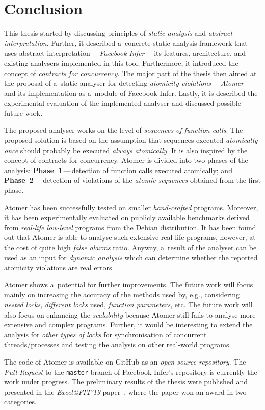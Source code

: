 \chapter{Conclusion}
\label{chap:conc}

This thesis started by discussing principles of \emph{static analysis} and
\emph{abstract interpretation}. Further, it described a~concrete static
analysis framework that uses abstract interpretation\,---\,\emph{Facebook
Infer}\,---\,its features, architecture, and existing analysers implemented
in this tool. Furthermore, it introduced the concept of
\emph{contracts for concurrency}. The major part of the thesis then aimed
at the proposal of a~static analyser for detecting \emph{atomicity
violations}\,---\,\emph{Atomer}\,---\,and its implementation as a~module
of Facebook Infer. Lastly, it is described the experimental evaluation of
the implemented analyser and discussed possible future work.

The proposed analyser works on the level of \emph{sequences of function
calls}. The proposed solution is based on the assumption that sequences
executed \emph{atomically once} should probably be executed \emph{always
atomically}. It is also inspired by the concept of contracts for concurrency.
Atomer is divided into two phases of the analysis:
\textbf{Phase~1}\,---\,detection of function calls executed atomically; and
\textbf{Phase~2}\,---\,detection of violations of the \emph{atomic sequences}
obtained from the first phase.

Atomer has been successfully tested on smaller \emph{hand-crafted}
programs. Moreover, it has been experimentally evaluated on publicly
available benchmarks derived from \emph{real-life low-level} programs
from the Debian distribution. It has been found out that Atomer is able
to analyse such extensive real-life programs, however, at the cost of quite
high \emph{false alarms} ratio. Anyway, a~result of the analyser can be
used as an input for \emph{dynamic analysis} which can determine whether
the reported atomicity violations are real errors.

Atomer shows a~potential for further improvements. The future work will
focus mainly on increasing the accuracy of the methods used by, e.g.,
considering \emph{nested locks}, \emph{different locks} used,
\emph{function parameters}, etc. The future work will also focus
on enhancing the \emph{scalability} because Atomer still fails to analyse more
extensive and complex programs. Further, it would be interesting to
extend the analysis for \emph{other types of locks} for synchronisation
of concurrent threads/processes and testing the analysis on other
real-world programs.

The code of Atomer is available on GitHub as an \emph{open-source
repository}. The \emph{Pull Request} to the \texttt{master} branch
of Facebook Infer's repository is currently the work under progress.
The preliminary results of the thesis were published and presented in
the \emph{Excel@FIT'19} paper~\cite{excel2019FBInfer}, where the paper won
an award in two categories.



